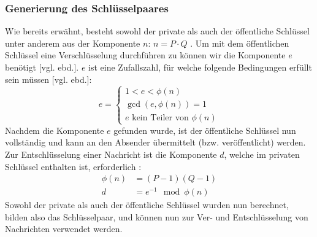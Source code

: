 \documentclass[a4paper,ngerman, headheight=28pt,12pt, footheight=27pt]{scrartcl}
\newcommand{\vcite}[1]{\cite[vgl.][]{#1}}
\newcommand{\vebd}{[vgl. ebd.]}
\begin{document}
\subsubsection{Generierung des Schlüsselpaares}
Wie bereits erwähnt, besteht sowohl der private als auch der öffentliche Schlüssel unter anderem aus der Komponente $n$: $n = P \cdot Q$ \vcite{RsaMaths1}. Um mit dem öffentlichen Schlüssel eine Verschlüsselung durchführen zu können wir die Komponente $e$ benötigt \vebd. $e$ ist eine Zufallszahl, für welche folgende Bedingungen erfüllt sein müssen \vebd:
\begin{equation*}
  e = \begin{cases}
    1 < e < \phi(n)      \\
    \gcd(e, \phi(n)) = 1 \\
    \text{$e$ kein Teiler von $\phi(n)$}
  \end{cases}
\end{equation*}
Nachdem die Komponente $e$ gefunden wurde, ist der öffentliche Schlüssel nun vollständig und kann an den Absender übermittelt (bzw. veröffentlicht) werden. Zur Entschlüsselung einer Nachricht ist die Komponente $d$, welche im privaten Schlüssel enthalten ist, erforderlich \vcite{RsaMaths1}:
\begin{equation*}
  \begin{aligned}
    \phi(n) & = (P-1)(Q-1)          \\
    d       & = e^{-1} \mod \phi(n)
  \end{aligned}
\end{equation*}
Sowohl der private als auch der öffentliche Schlüssel wurden nun berechnet, bilden also das Schlüsselpaar, und können nun zur Ver- und Entschlüsselung von Nachrichten verwendet werden.
\end{document}
